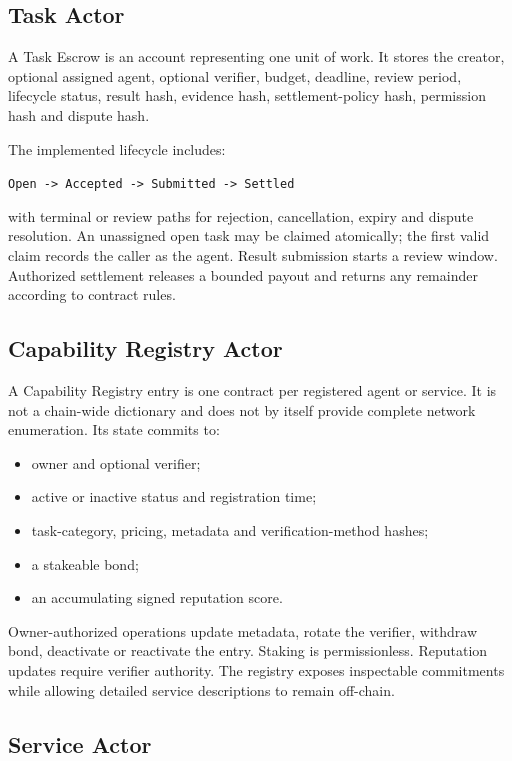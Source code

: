\documentclass[11pt,oneside]{article}
\begin{document}
\subsection{Task Actor}

A Task Escrow is an account representing one unit of work. It stores the creator, optional
assigned agent, optional verifier, budget, deadline, review period, lifecycle status, result
hash, evidence hash, settlement-policy hash, permission hash and dispute hash.

The implemented lifecycle includes:

\begin{center}
\texttt{Open -> Accepted -> Submitted -> Settled}
\end{center}

with terminal or review paths for rejection, cancellation, expiry and dispute resolution. An
unassigned open task may be claimed atomically; the first valid claim records the caller as the
agent. Result submission starts a review window. Authorized settlement releases a bounded
payout and returns any remainder according to contract rules.

\subsection{Capability Registry Actor}

A Capability Registry entry is one contract per registered agent or service. It is not a
chain-wide dictionary and does not by itself provide complete network enumeration. Its state
commits to:

\begin{itemize}
  \item owner and optional verifier;
  \item active or inactive status and registration time;
  \item task-category, pricing, metadata and verification-method hashes;
  \item a stakeable bond;
  \item an accumulating signed reputation score.
\end{itemize}

Owner-authorized operations update metadata, rotate the verifier, withdraw bond, deactivate
or reactivate the entry. Staking is permissionless. Reputation updates require verifier
authority. The registry exposes inspectable commitments while allowing detailed service
descriptions to remain off-chain.

\subsection{Service Actor}
\end{document}
